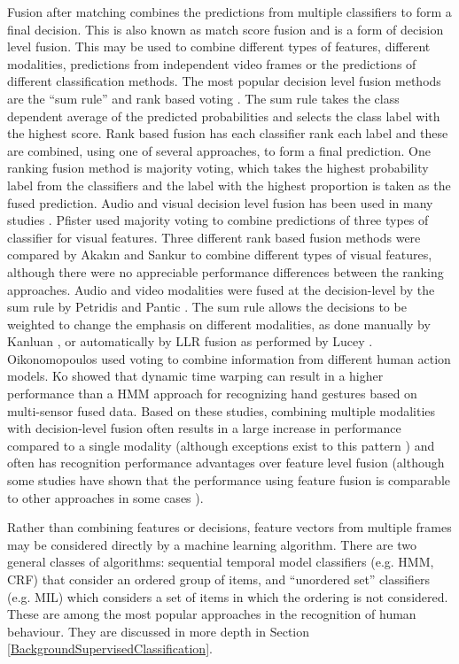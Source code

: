 Fusion after matching combines the predictions from multiple classifiers to form a final decision. This is also known as match score fusion and is a form of decision level fusion. This may be used to combine different types of features, different modalities, predictions from independent video frames or the predictions of different classification methods. The most popular decision level fusion methods are the ``sum rule'' and rank based voting \cite{Kittler2003}. The sum rule takes the class dependent average of the predicted probabilities and selects the class label with the highest score. Rank based fusion has each classifier rank each label and these are combined, using one of several approaches, to form a final prediction. One ranking fusion method is majority voting, which takes the highest probability label from the classifiers and the label with the highest proportion is taken as the fused prediction. Audio and visual decision level fusion has been used in many studies \cite{Vakayallapati2011, Poh2010, Petridis2008, Petridis2010, Kanluan2008}. Pfister \etal \cite{Pfister2011b} used majority voting to combine predictions of three types of classifier for visual features. Three different rank based fusion methods were compared by Akak{\i}n and Sankur \cite{Akakin2011} to combine different types of visual features, although there were no appreciable performance differences between the ranking approaches. Audio and video modalities were fused at the decision-level by the sum rule by Petridis and Pantic \cite{Petridis2008}. The sum rule allows the decisions to be weighted to change the emphasis on different modalities, as done manually by Kanluan \etal \cite{Kanluan2008}, or automatically by \ac{LLR} fusion as performed by Lucey \etal \cite{Lucey2009}. Oikonomopoulos \etal \cite{Oikonomopoulos2011} used voting to combine information from different human action models. Ko \etal \cite{Ko2008} showed that dynamic time warping can result in a higher performance than a \ac{HMM} approach for recognizing hand gestures based on multi-sensor fused data. Based on these studies, combining multiple modalities with decision-level fusion often results in a large increase in performance compared to a single modality (although exceptions exist to this pattern \cite{Nicolaou2011b}) and often has recognition performance advantages over feature level fusion (although some studies have shown that the performance using feature fusion is comparable to other approaches in some cases \cite{McCowan2005, Petridis2008}).

Rather than combining features or decisions, feature vectors from multiple frames may be considered directly by a machine learning algorithm. There are two general classes of algorithms: sequential temporal model classifiers (e.g. \ac{HMM}, \ac{CRF}) that consider an ordered group of items, and ``unordered set'' classifiers (e.g. \ac{MIL}) which considers a set of items in which the ordering is not considered. These are among the most popular approaches in the recognition of human behaviour. They are discussed in more depth in Section \ref{BackgroundSupervisedClassification}.

